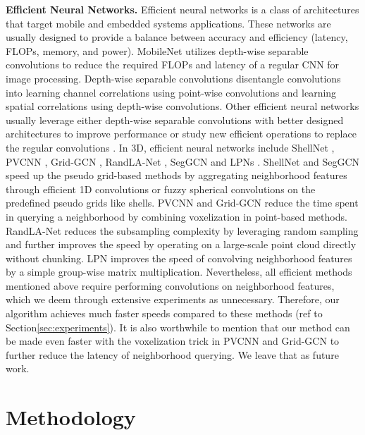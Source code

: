 \documentclass{article}
\newcommand{\secLabel}{Section\xspace}
\newcommand{\mysection}[1]{\vspace{3pt}\noindent\textbf{#1.}}
\begin{document}
\mysection{Efficient Neural Networks}
Efficient neural networks is a class of architectures that target mobile and embedded systems applications. These networks are usually designed to provide a balance between accuracy and efficiency (\eg latency, FLOPs, memory, and power). MobileNet \cite{Howard2017MobileNetsEC} utilizes depth-wise separable convolutions to reduce the required FLOPs and latency of a regular CNN for image processing. Depth-wise separable convolutions disentangle convolutions into learning channel correlations using point-wise convolutions and learning spatial correlations using depth-wise convolutions. Other efficient neural networks usually leverage either depth-wise separable convolutions with better designed architectures to improve performance \cite{Sandler2018MobileNetV2IR, Chollet2017XceptionDL, zhang2018efficient} or study new efficient operations to replace the regular convolutions \cite{Ma2018ShuffleNetVP, Wu2018ShiftAZ}. 
In 3D, efficient neural networks include ShellNet \cite{Zhang2019ShellNetEP}, PVCNN \cite{Liu2019PointVoxelCF}, Grid-GCN \cite{Xu2020GridGCNFF}, RandLA-Net \cite{Hu2020RandLANetES}, SegGCN \cite{Lei2020SegGCNE3} and LPNs \cite{Le2020GoingDW}. ShellNet \cite{Zhang2019ShellNetEP} and SegGCN \cite{Lei2020SegGCNE3} speed up the pseudo grid-based methods by aggregating neighborhood features through efficient 1D convolutions or fuzzy spherical convolutions on the predefined pseudo grids like shells. PVCNN \cite{Liu2019PointVoxelCF} and Grid-GCN \cite{Xu2020GridGCNFF} reduce the time spent in querying a neighborhood by combining voxelization in point-based methods.  RandLA-Net \cite{Hu2020RandLANetES} reduces the subsampling complexity by leveraging random sampling and further improves the speed by operating on a large-scale point cloud directly without chunking. 
LPN \cite{Le2020GoingDW} improves the speed of convolving neighborhood features by a simple group-wise matrix multiplication. Nevertheless, all efficient methods mentioned above require performing convolutions on neighborhood features, which we deem through extensive experiments as unnecessary. Therefore, our algorithm achieves much faster speeds compared to these methods (ref to \secLabel \ref{sec:experiments}). It is also worthwhile to mention that our method can be made even faster with the voxelization trick in PVCNN and Grid-GCN to further reduce the latency of neighborhood querying. We leave that as future work. 
 \section{Methodology}
\end{document}
